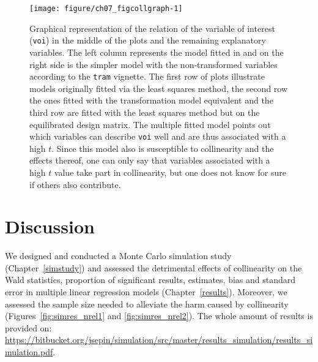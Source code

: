 \documentclass[11pt,a4paper,twoside]{book}\usepackage[]{graphicx}\usepackage[]{xcolor}
\newenvironment{knitrout}{}{} %
\begin{document}
\begin{figure}[H]%
\begin{center}
\begin{knitrout}
\color{fgcolor}
\texttt{[image: figure/ch07\_figcollgraph-1]} 
\end{knitrout}
\end{center}
\vspace{-1cm}
\caption{Graphical representation of the relation of the variable of interest (\texttt{voi}) in the middle of the plots and the remaining explanatory variables.  The left column represents the model fitted in \cite{Harrison1978} and on the right side is the simpler model with the non-transformed variables according to the \texttt{tram} vignette. The first row of plots illustrate models originally fitted via the least squares method, the second row the ones fitted with the transformation model equivalent and the third row are fitted with the least squares method but on the equilibrated design matrix. The multiple fitted model points out which variables can describe \texttt{voi} well and are thus associated with a high $t$. Since this model also is susceptible to collinearity and the effects thereof, one can only say that variables associated with a high $t$ value take part in collinearity, but one does not know for sure if others also contribute. }
\label{fig:dag}
\end{figure}






\chapter{Discussion}

We designed and conducted a Monte Carlo simulation study (Chapter~\ref{simstudy}) and assessed the detrimental effects of collinearity on the Wald statistics, proportion of significant results, estimates, bias and standard error in multiple linear regression models (Chapter~\ref{results}). Moreover, we assessed the sample size needed to alleviate the harm caused by collinearity (Figures~\ref{fig:simres_nrel1} and \ref{fig:simres_nrel2}). The whole amount of results is provided on: \url{https://bitbucket.org/jsepin/simulation/src/master/results_simulation/results_simulation.pdf}.
\end{document}
